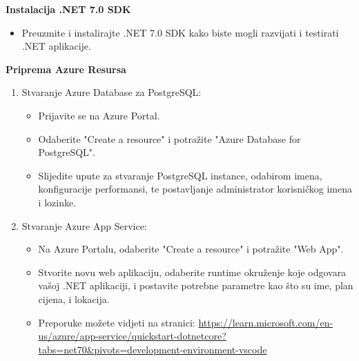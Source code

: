 				\textbf{Instalacija .NET 7.0 SDK}
				\begin{itemize}
					\item Preuzmite i instalirajte .NET 7.0 SDK kako biste mogli razvijati i testirati .NET aplikacije.
				\end{itemize}

				\textbf{Priprema Azure Resursa}
				\begin{enumerate}
					\item Stvaranje Azure Database za PostgreSQL:
					\begin{itemize}
						\item Prijavite se na Azure Portal.
						\item Odaberite "Create a resource" i potražite "Azure Database for PostgreSQL".
						\item Slijedite upute za stvaranje PostgreSQL instance, odabirom imena, konfiguracije performansi, te postavljanje administrator korisničkog imena i lozinke.
					\end{itemize}
					\item Stvaranje Azure App Service:
					\begin{itemize}
						\item Na Azure Portalu, odaberite "Create a resource" i potražite "Web App".
						\item Stvorite novu web aplikaciju, odaberite runtime okruženje koje odgovara vašoj .NET aplikaciji, i postavite potrebne parametre kao što su ime, plan cijena, i lokacija.
						\item Preporuke možete vidjeti na stranici: \url{https://learn.microsoft.com/en-us/azure/app-service/quickstart-dotnetcore?tabs=net70&pivots=development-environment-vscode}
					\end{itemize}
				\end{enumerate}

